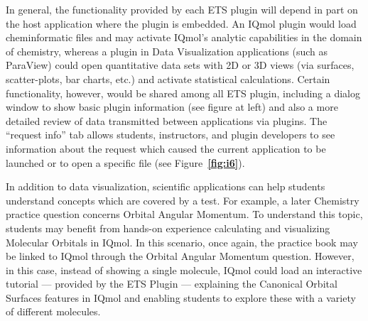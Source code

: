 \documentclass[10pt,letterpaper]{article}
\newcommand{\sectsp}{\vspace{12pt}}
\newcommand{\bref}[1]{\hspace*{1pt}\textbf{\ref{#1}}}
\newcommand{\GRE}{\resizebox{!}{8.5pt}{\AcronymText{GRE}}}
\newcommand{\textscc}[1]{{\color{orr!35!black}{{%
						\fontfamily{Cabin-TLF}\fontseries{b}\selectfont{\textsc{\scriptsize{#1}}}}}}}
\newcommand{\AcronymText}[1]{{\textscc{#1}}}
\newcommand{\p}[1]{

\vspace{.5em}#1}
\newcommand{\q}[1]{{\fontfamily{qcr}\selectfont ``}#1{\fontfamily{qcr}\selectfont ''}}
\newcommand{\lun}[1]{\raisebox{-4pt}{\fontfamily{qcr}\selectfont{%
\LARGE{\textbf{\textcolor{tcolor}{#1}}}}}\vspace{-2pt}}
\begin{document}
{\p{\begin{figure}
		
	\end{figure}In general, the functionality 
	provided by each ETS plugin will 
	depend in part on the host application where the 
	plugin is embedded.  An IQmol plugin would load 
	cheminformatic files and may activate IQmol's analytic 
	capabilities in the domain of chemistry, whereas 
	a plugin in Data Visualization applications (such 
	as ParaView) could open quantitative data sets 
	with 2D or 3D views (via surfaces, scatter-plots, 
	bar charts, etc.) and activate statistical calculations.  Certain functionality, however, would be shared 
	among all ETS plugin, including a dialog window to 
	show basic plugin information (see figure at left) 
	and also a more detailed review of data transmitted 
	between applications via plugins.  
	The \q{request info} tab allows students, instructors, 
	and plugin developers to see information about the 
	request which caused the current application to be 
	launched or to open a specific file (see Figure~\bref{fig:i6}).}

\p{In addition to data visualization, scientific 
applications can help students understand concepts 
which are covered by a test.  For example, a later 
\GRE{} Chemistry practice question concerns 
Orbital Angular Momentum.  To understand 
this topic, students may benefit from hands-on 
experience calculating and visualizing 
Molecular Orbitals in IQmol.  In this 
scenario, once again, the practice book may 
be linked to IQmol through the Orbital Angular 
Momentum question.  However, in this case, 
instead of showing a single molecule, IQmol 
could load an interactive tutorial --- 
provided by the ETS Plugin --- explaining 
the Canonical Orbital Surfaces features in 
IQmol and enabling students to explore 
these with a variety of different molecules.}



\vspace{2em}
\noindent\lun{Use-Cases for the Proposed ETS Plugin Framework}
{\sectsp}

}
\end{document}
